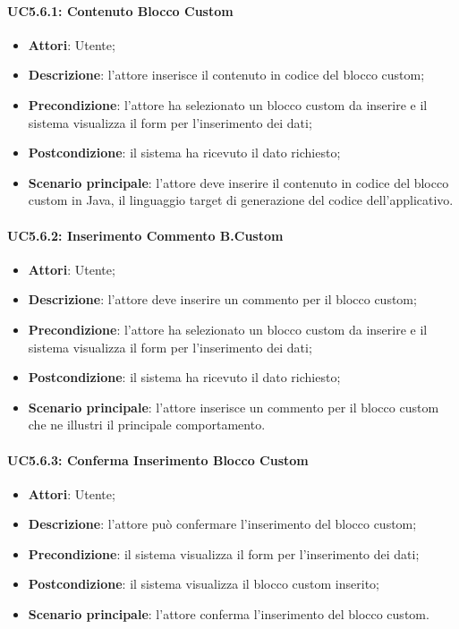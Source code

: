 \paragraph{UC5.6.1: Contenuto Blocco Custom}
\label{UC5.6.1}
\begin{itemize}
\item \textbf{Attori}: Utente;
\item \textbf{Descrizione}: l'attore inserisce il contenuto in codice del blocco custom;	
\item \textbf{Precondizione}: l'attore ha selezionato un blocco custom da inserire e il sistema visualizza il form per l'inserimento dei dati;	
\item \textbf{Postcondizione}: il sistema ha ricevuto il dato richiesto;	
\item \textbf{Scenario principale}:
l'attore deve inserire il contenuto in codice del blocco custom in Java, il linguaggio target di generazione del codice dell'applicativo.	
\end{itemize}

\paragraph{UC5.6.2: Inserimento Commento B.Custom}
\label{UC5.6.2}
\begin{itemize}
\item \textbf{Attori}: Utente;
\item \textbf{Descrizione}: l'attore deve inserire un commento per il blocco custom;	
\item \textbf{Precondizione}: l'attore ha selezionato un blocco custom da inserire e il sistema visualizza il form per l'inserimento dei dati;	
\item \textbf{Postcondizione}: il sistema ha ricevuto il dato richiesto;	
\item \textbf{Scenario principale}:
l'attore inserisce un commento per il blocco custom che ne illustri il principale comportamento.
\end{itemize}

\paragraph{UC5.6.3: Conferma Inserimento Blocco Custom}
\label{UC5.6.3}
\begin{itemize}
\item \textbf{Attori}: Utente;
\item \textbf{Descrizione}: l'attore può confermare l'inserimento del blocco custom;	
\item \textbf{Precondizione}: il sistema visualizza il form per l'inserimento dei dati;	
\item \textbf{Postcondizione}: il sistema visualizza il blocco custom inserito;	
\item \textbf{Scenario principale}:
l'attore conferma l'inserimento del blocco custom.
\end{itemize}

